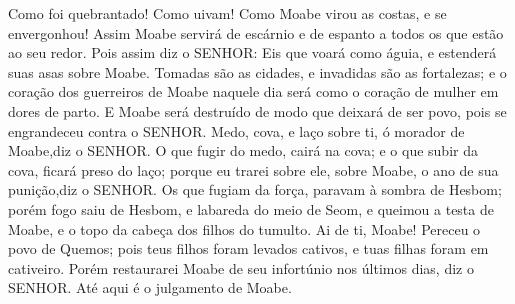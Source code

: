 {Como foi quebrantado! Como uivam! Como Moabe virou as costas, e se envergonhou! Assim Moabe servirá de escárnio e de espanto a todos os que estão ao seu redor.
Pois assim diz o SENHOR: Eis que voará como águia, e estenderá suas asas sobre Moabe.
Tomadas são as cidades, e invadidas são as fortalezas; e o coração dos guerreiros de Moabe naquele dia será como o coração de mulher em dores de parto.
E Moabe será destruído de modo que deixará de ser povo, pois se engrandeceu contra o SENHOR.
Medo, cova, e laço
{} sobre ti, ó morador de Moabe,diz o SENHOR.
O que fugir do medo, cairá na cova; e o que subir da cova, ficará preso do laço; porque eu trarei sobre ele, sobre Moabe, o ano de sua punição,diz o SENHOR.
Os que fugiam da força, paravam à sombra de Hesbom; porém fogo saiu de Hesbom, e labareda do meio de Seom, e queimou a testa de Moabe, e o topo da cabeça dos filhos do tumulto.
Ai de ti, Moabe! Pereceu o povo de Quemos; pois teus filhos foram levados cativos, e tuas filhas foram em cativeiro.
Porém restaurarei Moabe de seu infortúnio nos últimos dias, diz o SENHOR. Até aqui é o julgamento de Moabe.

\par }

